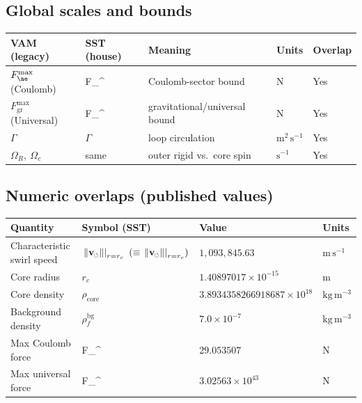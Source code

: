 \documentclass[11pt]{article}
\newcommand{\vscore}{v_s}                                %
\newcommand{\vnorm}{\lVert \mathbf{v}_{\mkern-2mu\scriptscriptstyle\boldsymbol{\circlearrowleft}} \rVert}               %
\newcommand{\rhoF}{\rho_{\!f}}                           %
\newcommand{\rhoC}{\rho_{\mathrm{core}}}                 %
\newcommand{\FmaxEM}{F_{\mathrm{EM}}^{\max}}             %
\newcommand{\FmaxG}{F_{\mathrm{G}}^{\max}}               %
\providecommand{\rc}{r_c} %
\newcommand{\vcore}{\left.\vnorm\right|_{r=\rc}}        %
\renewcommand{\vscore}{\vcore}
\begin{document}
    \subsection*{Global scales and bounds}
        \begin{center}
            \begin{tabular}{lllll}
                \hline
                \textbf{VAM (legacy)} & \textbf{SST (house)} & \textbf{Meaning} & \textbf{Units} & \textbf{Overlap} \\
                \hline
                $F_{\ae}^{\max}$ (Coulomb) & \FmaxEM & Coulomb-sector bound & $\mathrm{N}$ & Yes \\
                $F_{\mathrm{gr}}^{\max}$ (Universal) & \FmaxG & gravitational/universal bound & $\mathrm{N}$ & Yes \\
                $\Gamma$ & $\Gamma$ & loop circulation & $\mathrm{m^{2}\,s^{-1}}$ & Yes \\
                $\Omega_R,\ \Omega_c$ & same & outer rigid vs.\ core spin & $\mathrm{s^{-1}}$ & Yes \\
                \hline
            \end{tabular}
        \end{center}

    \subsection*{Numeric overlaps (published values)}
        \begin{center}
            \begin{tabular}{llll}
                \hline
                \textbf{Quantity} & \textbf{Symbol (SST)} & \textbf{Value} & \textbf{Units} \\
                \hline
                Characteristic swirl speed & $\vscore\ (\equiv \left.\vnorm\right|_{r=\rc})$ & $1{,}093{,}845.63$ & $\mathrm{m\,s^{-1}}$ \\
                Core radius & $r_c$ & $1.40897017\times 10^{-15}$ & $\mathrm{m}$ \\
                Core density & $\rhoC$ & $3.8934358266918687\times 10^{18}$ & $\mathrm{kg\,m^{-3}}$ \\
                Background density & $\rhoF^{\mathrm{bg}}$ & $7.0\times 10^{-7}$ & $\mathrm{kg\,m^{-3}}$ \\
                Max Coulomb force & \FmaxEM & $29.053507$ & $\mathrm{N}$ \\
                Max universal force & \FmaxG & $3.02563\times 10^{43}$ & $\mathrm{N}$ \\
                \hline
            \end{tabular}
        \end{center}
\end{document}

